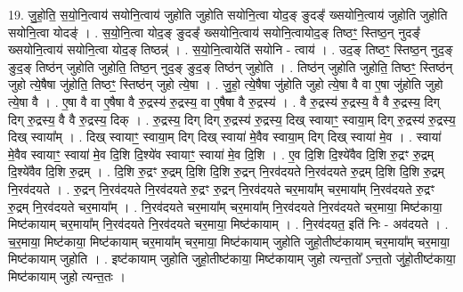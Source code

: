 \documentclass[17pt]{extarticle}
\begin{document}
19. जु॒हो॒ति॒ स॒यो॒नि॒त्वाय॑ सयोनि॒त्वाय॑ जुहोति जुहोति सयोनि॒त्वा योद॒ङ् ङुदङ्᳚ ख्सयोनि॒त्वाय॑ जुहोति जुहोति सयोनि॒त्वा योदङ्॑ । . स॒यो॒नि॒त्वा योद॒ङ् ङुदङ्᳚ ख्सयोनि॒त्वाय॑ सयोनि॒त्वायोद॒ङ् तिष्ठꣳ॒॒ स्तिष्ठ॒न् नुदङ्᳚ ख्सयोनि॒त्वाय॑ सयोनि॒त्वा योद॒ङ् तिष्ठन्न्॑ । . स॒यो॒नि॒त्वायेति॑ सयोनि - त्वाय॑ । . उद॒ङ् तिष्ठꣳ॒॒ स्तिष्ठ॒न् नुद॒ङ् ङुद॒ङ् तिष्ठ॑न् जुहोति जुहोति॒ तिष्ठ॒न् नुद॒ङ् ङुद॒ङ् तिष्ठ॑न् जुहोति । . तिष्ठ॑न् जुहोति जुहोति॒ तिष्ठꣳ॒॒ स्तिष्ठ॑न् जुहो त्ये॒षैषा जु॑होति॒ तिष्ठꣳ॒॒ स्तिष्ठ॑न् जुहो त्ये॒षा । . जु॒हो॒ त्ये॒षैषा जु॑होति जुहो त्ये॒षा वै वा ए॒षा जु॑होति जुहो त्ये॒षा वै । . ए॒षा वै वा ए॒षैषा वै रु॒द्रस्य॑ रु॒द्रस्य॒ वा ए॒षैषा वै रु॒द्रस्य॑ । . वै रु॒द्रस्य॑ रु॒द्रस्य॒ वै वै रु॒द्रस्य॒ दिग् दिग् रु॒द्रस्य॒ वै वै रु॒द्रस्य॒ दिक् । . रु॒द्रस्य॒ दिग् दिग् रु॒द्रस्य॑ रु॒द्रस्य॒ दिख् स्वायाꣳ॒॒ स्वाया॒म् दिग् रु॒द्रस्य॑ रु॒द्रस्य॒ दिख् स्वाया᳚म् । . दिख् स्वायाꣳ॒॒ स्वाया॒म् दिग् दिख् स्वाया॑ मे॒वैव स्वाया॒म् दिग् दिख् स्वाया॑ मे॒व । . स्वाया॑ मे॒वैव स्वायाꣳ॒॒ स्वाया॑ मे॒व दि॒शि दि॒श्ये॑व स्वायाꣳ॒॒ स्वाया॑ मे॒व दि॒शि । . ए॒व दि॒शि दि॒श्ये॑वैव दि॒शि रु॒द्रꣳ रु॒द्रम् दि॒श्ये॑वैव दि॒शि रु॒द्रम् । . दि॒शि रु॒द्रꣳ रु॒द्रम् दि॒शि दि॒शि रु॒द्रन् नि॒रव॑दयते नि॒रव॑दयते रु॒द्रम् दि॒शि दि॒शि रु॒द्रम् नि॒रव॑दयते । . रु॒द्रन् नि॒रव॑दयते नि॒रव॑दयते रु॒द्रꣳ रु॒द्रन् नि॒रव॑दयते चर॒माया᳚म् चर॒माया᳚म् नि॒रव॑दयते रु॒द्रꣳ रु॒द्रम् नि॒रव॑दयते चर॒माया᳚म् । . नि॒रव॑दयते चर॒माया᳚म् चर॒माया᳚म् नि॒रव॑दयते नि॒रव॑दयते चर॒माया॒ मिष्ट॑काया॒ मिष्ट॑कायाम् चर॒माया᳚म् नि॒रव॑दयते नि॒रव॑दयते चर॒माया॒ मिष्ट॑कायाम् । . नि॒रव॑दयत॒ इति॑ निः - अव॑दयते । . च॒र॒माया॒ मिष्ट॑काया॒ मिष्ट॑कायाम् चर॒माया᳚म् चर॒माया॒ मिष्ट॑कायाम् जुहोति जुहो॒तीष्ट॑कायाम् चर॒माया᳚म् चर॒माया॒ मिष्ट॑कायाम् जुहोति । . इष्ट॑कायाम् जुहोति जुहो॒तीष्ट॑काया॒ मिष्ट॑कायाम् जुहो त्यन्त॒तो᳚ ऽन्त॒तो जु॑हो॒तीष्ट॑काया॒ मिष्ट॑कायाम् जुहो त्यन्त॒तः । \newline
\end{document}
